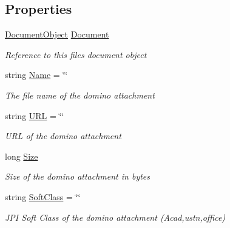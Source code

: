 \subsection*{Properties}
\begin{DoxyCompactItemize}
\item 
\mbox{\hyperlink{class_document_object}{Document\+Object}} \mbox{\hyperlink{class_file_object_a0c9650a6ae1efb95f8211f9fa3b883fe}{Document}}
\begin{DoxyCompactList}\small\item\em Reference to this files document object \end{DoxyCompactList}\item 
string \mbox{\hyperlink{class_file_object_a9d47aff166393cb47490da2661576d62}{Name}} = \char`\"{}\char`\"{}
\begin{DoxyCompactList}\small\item\em The file name of the domino attachment \end{DoxyCompactList}\item 
string \mbox{\hyperlink{class_file_object_a7355eaeea3fe40bd8862d7f1f9b479da}{U\+RL}} = \char`\"{}\char`\"{}
\begin{DoxyCompactList}\small\item\em U\+RL of the domino attachment \end{DoxyCompactList}\item 
long \mbox{\hyperlink{class_file_object_a7aa7737c1ce05f4424ba16dded444949}{Size}}
\begin{DoxyCompactList}\small\item\em Size of the domino attachment in bytes \end{DoxyCompactList}\item 
string \mbox{\hyperlink{class_file_object_a5e9b8f083b53ea0450a0560c16292a2f}{Soft\+Class}} = \char`\"{}\char`\"{}
\begin{DoxyCompactList}\small\item\em J\+PI Soft Class of the domino attachment (Acad,ustn,office) \end{DoxyCompactList}\item 

\end{DoxyCompactItemize}
